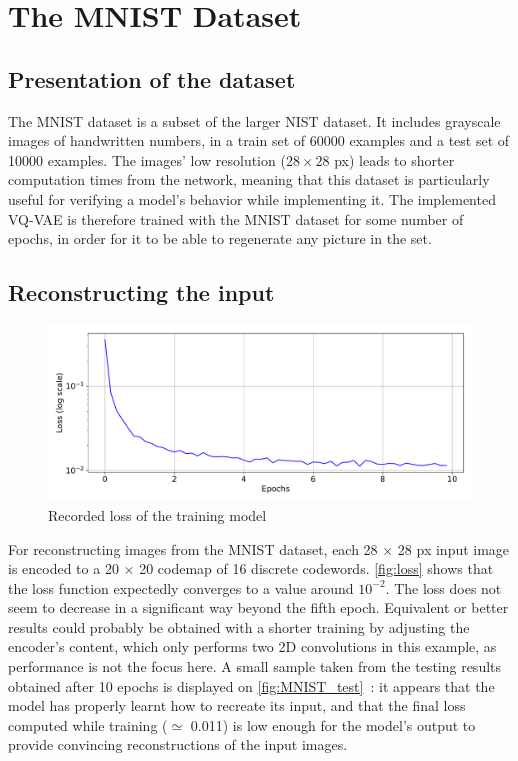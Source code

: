 \documentclass{article}
\begin{document}
\section{The MNIST Dataset}\label{sec:MNIST}

\subsection{Presentation of the dataset}
The MNIST dataset is a subset of the larger NIST dataset. It includes grayscale images of handwritten numbers, in a train set of 60000 examples and a test set of 10000 examples. The images' low resolution ($28 \times 28$ px) leads to shorter computation times from the network, meaning that this dataset is particularly useful for verifying a model's behavior while implementing it. The implemented VQ-VAE is therefore trained with the MNIST dataset for some number of epochs, in order for it to be able to regenerate any picture in the set. 

\subsection{Reconstructing the input}

\begin{figure}[ht]
    \centering
    \includegraphics[width=\columnwidth]{figs/loss.pdf}
    \caption{Recorded loss of the training model}
    \label{fig:loss}
\end{figure}

For reconstructing images from the MNIST dataset, each 28 $\times$ 28 px input image is encoded to a 20 $\times$ 20 codemap of 16 discrete codewords. \autoref{fig:loss} shows that the loss function expectedly converges to a value around $10^{-2}$. The loss does not seem to decrease in a significant way beyond the fifth epoch. Equivalent or better results could probably be obtained with a shorter training by adjusting the encoder's content, which only performs two 2D convolutions in this example, as performance is not the focus here.
A small sample taken from the testing results obtained after 10 epochs is displayed on \autoref{fig:MNIST_test}~: it appears that the model has properly learnt how to recreate its input, and that the final loss computed while training ($\simeq$ 0.011) is low enough for the model's output to provide convincing reconstructions of the input images.
\end{document}
